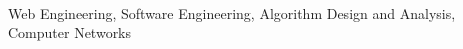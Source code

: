  \\[0.1cm]
\hspace*{0.65cm}Web Engineering, Software Engineering, Algorithm Design and Analysis, Computer Networks
